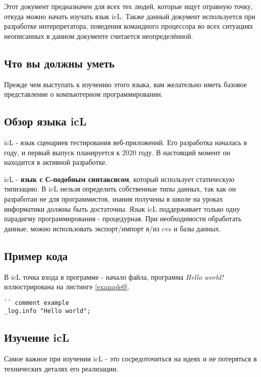 \documentclass[a4paper, 14pt]{extarticle}
\begin{document}
Этот документ предназначен для всех тех людей, которые ищут отравную точку, откуда можно начать изучать язык icL. Также данный документ используется при разработке интерпретатора, поведения командного процессора во всех ситуациях неописанных в данном документе считается неопределённой.

\subsection{Что вы должны уметь}

Прежде чем выступать к изучению этого языка, вам желательно иметь базовое представление о компьютерном программировании.

\subsection{Обзор языка icL}

icL - язык сценариев тестирования веб-приложений. Его разработка началась в году, и первый выпуск планируется к 2020 году. В настоящий момент он находится в активной разработке.

icL - \textbf{язык с С-подобным синтаксисом}, который использует статическую типизацию. В icL нельзя определить собственные типы данных, так как он разработан не для программистов, знания получены в школе на уроках информатики должны быть достаточны. Язык icL поддерживает только одну парадигму программирования - процедурная. При необходимости обработать данные, можно использовать экспорт/импорт в/из cvs и базы данных.

\subsection{Пример кода}

В icL точка входа в программе - начало файла, программа \textit{Hello world!} иллюстрирована на листинге \ref{example0}.

\begin{lstlisting}[caption=Пример, label=example0]
`` comment example
_log.info "Hello world";
\end{lstlisting}

\subsection{Изучение icL}

Самое важное при изучении icL - это сосредоточиться на идеях и не потеряться в технических деталях его реализации.
\end{document}
